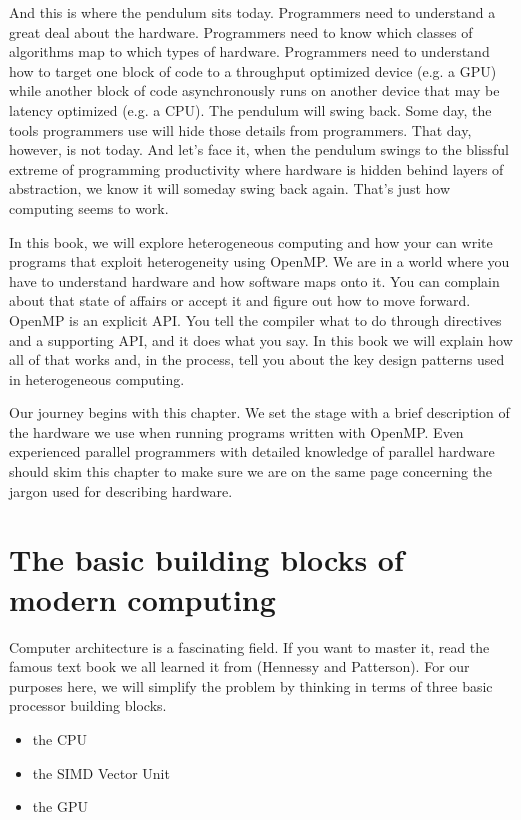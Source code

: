 And this is where the pendulum sits today.   Programmers need to understand a great deal about the hardware.  Programmers need to 
know which classes of algorithms map to which types of hardware.  Programmers need to understand how to target one block of 
code to a throughput optimized device (e.g. a GPU) while another block of code asynchronously runs on another device
that may be latency optimized (e.g. a CPU).  The pendulum will swing back.  Some day, the tools programmers use will 
hide those details from programmers.   That day, however, is not today.   And let's face it, when the pendulum swings to the
blissful extreme of programming productivity where hardware is hidden behind layers of abstraction, we know it will someday
swing back again.  That's just how computing seems to work.

In this book, we will explore heterogeneous computing and how your can write programs that exploit heterogeneity 
using OpenMP.  We are in a world where you have to understand hardware and how software maps onto it.   You can 
complain about that state of affairs or accept it and figure out how to move forward.  OpenMP is an explicit API.  You 
tell the compiler what to do through directives and a supporting API, and it does what you say.    In this book we will
explain how all of that works and, in the process, tell you about the key design patterns used in heterogeneous computing.

Our journey begins with this chapter.  We set the stage with a brief description of the hardware we use when
running programs written with OpenMP.   Even experienced parallel programmers with detailed knowledge of
parallel hardware should skim this chapter to make sure we are on the same page concerning the jargon used
for describing hardware.

\section{The basic building blocks of modern computing}

Computer architecture is a fascinating field. If you want to master it, read the
famous text book we all learned it from (Hennessy and Patterson).  For our purposes
here, we will simplify the problem by thinking in terms of three basic processor building blocks.

\begin{itemize}
\item  the CPU
\item  the SIMD Vector Unit
\item  the GPU
\end{itemize}

